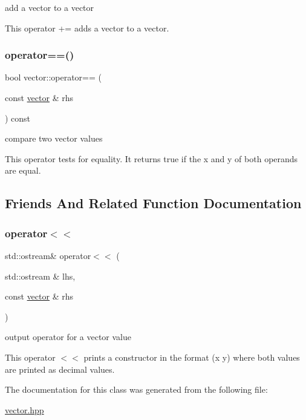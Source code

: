 add a vector to a vector 

This operator += adds a vector to a vector. \mbox{\label{classvector_a0066b879f704f7d344ec9cd2a2f57ea3}} 
\subsubsection{\texorpdfstring{operator==()}{operator==()}}
{\footnotesize\ttfamily bool vector\+::operator== (\begin{DoxyParamCaption}\item[{const \hyperlink{classvector}{vector} \&}]{rhs }\end{DoxyParamCaption}) const\hspace{0.3cm}{\ttfamily [inline]}}



compare two vector values 

This operator tests for equality. It returns true if the x and y of both operands are equal. 

\subsection{Friends And Related Function Documentation}
\mbox{\label{classvector_a7a6813f75dabd6f9575f9d6f91890255}} 
\subsubsection{\texorpdfstring{operator$<$$<$}{operator<<}}
{\footnotesize\ttfamily std\+::ostream\& operator$<$$<$ (\begin{DoxyParamCaption}\item[{std\+::ostream \&}]{lhs,  }\item[{const \hyperlink{classvector}{vector} \&}]{rhs }\end{DoxyParamCaption})\hspace{0.3cm}{\ttfamily [friend]}}



output operator for a vector value 

This operator $<$$<$ prints a constructor in the format (x y) where both values are printed as decimal values. 

The documentation for this class was generated from the following file\+:\begin{DoxyCompactItemize}
\item 
\hyperlink{vector_8hpp}{vector.\+hpp}\end{DoxyCompactItemize}

